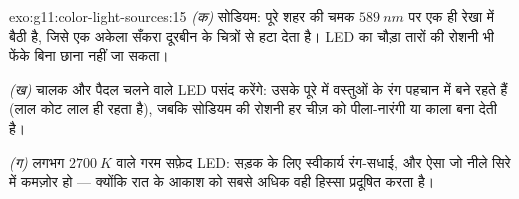 \begin{solution}{exo:g11:color-light-sources:15}
\emph{(क)} सोडियम: पूरे शहर की चमक $\qty{589}{nm}$ पर एक ही रेखा में बैठी है,
जिसे एक अकेला सँकरा  दूरबीन के चित्रों से हटा देता है।
LED का चौड़ा  तारों की रोशनी भी फेंके बिना छाना नहीं जा
सकता।

\emph{(ख)} चालक और पैदल चलने वाले LED पसंद करेंगे: उसके पूरे
 में वस्तुओं के रंग पहचान में बने रहते हैं (लाल कोट लाल
ही रहता है), जबकि सोडियम की रोशनी हर चीज़ को पीला-नारंगी या काला बना
देती है।

\emph{(ग)} लगभग $\qty{2700}{K}$ वाले गरम सफ़ेद LED: सड़क के लिए स्वीकार्य रंग-सधाई,
और ऐसा  जो नीले सिरे में कमज़ोर हो --- क्योंकि रात के
आकाश को सबसे अधिक वही हिस्सा प्रदूषित करता है।
\end{solution}

